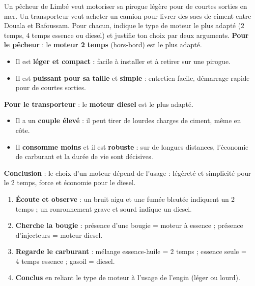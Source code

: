 \documentclass[11pt]{article}
\begin{document}
\begin{exoresolu}
Un pêcheur de Limbé veut motoriser sa pirogue légère pour de courtes sorties en mer. Un transporteur veut acheter un camion pour livrer des sacs de ciment entre Douala et Bafoussam. Pour chacun, indique le type de moteur le plus adapté (2 temps, 4 temps essence ou diesel) et justifie ton choix par deux arguments.
\tcblower
\textbf{Pour le pêcheur} : le \textbf{moteur 2 temps} (hors-bord) est le plus adapté.
\begin{itemize}
\item Il est \textbf{léger et compact} : facile à installer et à retirer sur une pirogue.
\item Il est \textbf{puissant pour sa taille} et \textbf{simple} : entretien facile, démarrage rapide pour de courtes sorties.
\end{itemize}
\textbf{Pour le transporteur} : le \textbf{moteur diesel} est le plus adapté.
\begin{itemize}
\item Il a un \textbf{couple élevé} : il peut tirer de lourdes charges de ciment, même en côte.
\item Il \textbf{consomme moins} et il est \textbf{robuste} : sur de longues distances, l'économie de carburant et la durée de vie sont décisives.
\end{itemize}
\textbf{Conclusion} : le choix d'un moteur dépend de l'usage : légèreté et simplicité pour le 2 temps, force et économie pour le diesel.
\end{exoresolu}

\begin{methode}
\begin{enumerate}
\item \textbf{Écoute et observe} : un bruit aigu et une fumée bleutée indiquent un 2 temps ; un ronronnement grave et sourd indique un diesel.
\item \textbf{Cherche la bougie} : présence d'une bougie = moteur à essence ; présence d'injecteurs = moteur diesel.
\item \textbf{Regarde le carburant} : mélange essence-huile = 2 temps ; essence seule = 4 temps essence ; gasoil = diesel.
\item \textbf{Conclus} en reliant le type de moteur à l'usage de l'engin (léger ou lourd).
\end{enumerate}
\end{methode}
\end{document}
